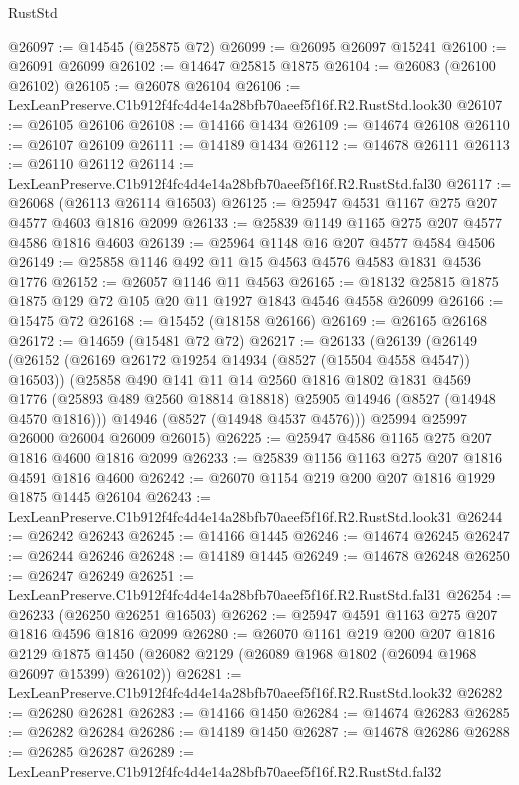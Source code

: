 \begin{lexlean}{RustStd}
\begin{coremodule}
@26097 := @14545 (@25875 @72)
@26099 := @26095 @26097 @15241
@26100 := @26091 @26099
@26102 := @14647 @25815 @1875
@26104 := @26083 (@26100 @26102)
@26105 := @26078 @26104
@26106 := LexLeanPreserve.C1b912f4fc4d4e14a28bfb70aeef5f16f.R2.RustStd.look30
@26107 := @26105 @26106
@26108 := @14166 @1434
@26109 := @14674 @26108
@26110 := @26107 @26109
@26111 := @14189 @1434
@26112 := @14678 @26111
@26113 := @26110 @26112
@26114 := LexLeanPreserve.C1b912f4fc4d4e14a28bfb70aeef5f16f.R2.RustStd.fal30
@26117 := @26068 (@26113 @26114 @16503)
@26125 := @25947 @4531 @1167 @275 @207 @4577 @4603 @1816 @2099
@26133 := @25839 @1149 @1165 @275 @207 @4577 @4586 @1816 @4603
@26139 := @25964 @1148 @16 @207 @4577 @4584 @4506
@26149 := @25858 @1146 @492 @11 @15 @4563 @4576 @4583 @1831 @4536 @1776
@26152 := @26057 @1146 @11 @4563
@26165 := @18132 @25815 @1875 @1875 @129 @72 @105 @20 @11 @1927 @1843 @4546 @4558 @26099
@26166 := @15475 @72
@26168 := @15452 (@18158 @26166)
@26169 := @26165 @26168
@26172 := @14659 (@15481 @72 @72)
@26217 := @26133
    (@26139
      (@26149
        (@26152 (@26169 @26172 @19254 @14934 (@8527 (@15504 @4558 @4547)) @16503))
        (@25858
          @490
          @141
          @11
          @14
          @2560
          @1816
          @1802
          @1831
          @4569
          @1776
          (@25893 @489 @2560 @18814 @18818)
          @25905
          @14946
          (@8527 (@14948 @4570 @1816)))
        @14946
        (@8527 (@14948 @4537 @4576)))
      @25994
      @25997
      @26000
      @26004
      @26009
      @26015)
@26225 := @25947 @4586 @1165 @275 @207 @1816 @4600 @1816 @2099
@26233 := @25839 @1156 @1163 @275 @207 @1816 @4591 @1816 @4600
@26242 := @26070 @1154 @219 @200 @207 @1816 @1929 @1875 @1445 @26104
@26243 := LexLeanPreserve.C1b912f4fc4d4e14a28bfb70aeef5f16f.R2.RustStd.look31
@26244 := @26242 @26243
@26245 := @14166 @1445
@26246 := @14674 @26245
@26247 := @26244 @26246
@26248 := @14189 @1445
@26249 := @14678 @26248
@26250 := @26247 @26249
@26251 := LexLeanPreserve.C1b912f4fc4d4e14a28bfb70aeef5f16f.R2.RustStd.fal31
@26254 := @26233 (@26250 @26251 @16503)
@26262 := @25947 @4591 @1163 @275 @207 @1816 @4596 @1816 @2099
@26280 := @26070
    @1161
    @219
    @200
    @207
    @1816
    @2129
    @1875
    @1450
    (@26082 @2129 (@26089 @1968 @1802 (@26094 @1968 @26097 @15399) @26102))
@26281 := LexLeanPreserve.C1b912f4fc4d4e14a28bfb70aeef5f16f.R2.RustStd.look32
@26282 := @26280 @26281
@26283 := @14166 @1450
@26284 := @14674 @26283
@26285 := @26282 @26284
@26286 := @14189 @1450
@26287 := @14678 @26286
@26288 := @26285 @26287
@26289 := LexLeanPreserve.C1b912f4fc4d4e14a28bfb70aeef5f16f.R2.RustStd.fal32

\end{coremodule}
\end{lexlean}

